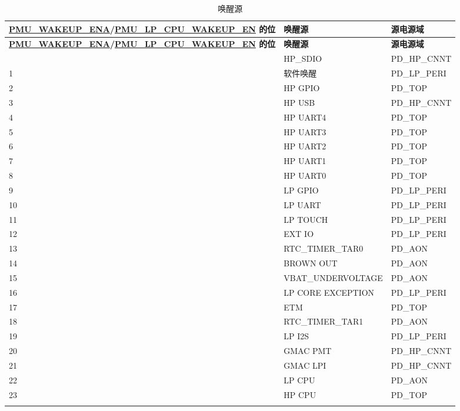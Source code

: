 \documentclass[main\_\_CN.tex]{subfiles}
\begin{document}
\begin{longtable}{ | l | l | l | }
\caption{唤醒源}
\label{tab:lowpowm-wakeup-source}
\\\hline
\rowcolor{lightgray}
\textbf{\hyperref[fielddesc:PMUWAKEUPENA]{PMU\_WAKEUP\_ENA}/\hyperref[fielddesc:PMULPCPUWAKEUPEN]{PMU\_LP\_CPU\_WAKEUP\_EN} 的位} & \textbf{唤醒源} &  \textbf{源电源域}   \\\hline
\endfirsthead
\hline\rowcolor{lightgray}
\textbf{\hyperref[fielddesc:PMUWAKEUPENA]{PMU\_WAKEUP\_ENA}/\hyperref[fielddesc:PMULPCPUWAKEUPEN]{PMU\_LP\_CPU\_WAKEUP\_EN} 的位} & \textbf{唤醒源} &  \textbf{源电源域}   \\\hline
\endhead
\endfoot
\iftagged{ESP32-P4-latest}{
    0 & HP\_SDIO & PD\_HP\_CNNT  \\\hline
    1 & 软件唤醒 & PD\_LP\_PERI \\\hline
    2 & HP GPIO   & PD\_TOP  \\\hline
    3 & HP USB  & PD\_HP\_CNNT  \\\hline
    4 & HP UART4 & PD\_TOP \\\hline
    5 & HP UART3 & PD\_TOP  \\\hline
    6 & HP UART2 & PD\_TOP  \\\hline
    7 & HP UART1 & PD\_TOP  \\\hline
    8 & HP UART0 & PD\_TOP  \\\hline
    9 & LP GPIO & PD\_LP\_PERI \\\hline
    10 & LP UART & PD\_LP\_PERI  \\\hline
    11 & LP TOUCH & PD\_LP\_PERI  \\\hline
    12 & EXT IO & PD\_LP\_PERI  \\\hline
    13 & RTC\_TIMER\_TAR0 & PD\_AON  \\\hline
    14 & BROWN OUT & PD\_AON  \\\hline
    15 & VBAT\_UNDERVOLTAGE & PD\_AON  \\\hline
    16 & LP CORE EXCEPTION & PD\_LP\_PERI  \\\hline
    17 & ETM & PD\_TOP  \\\hline
    18 & RTC\_TIMER\_TAR1 & PD\_AON  \\\hline
    19 & LP I2S & PD\_LP\_PERI  \\\hline
    20 & GMAC PMT & PD\_HP\_CNNT  \\\hline
    21 & GMAC LPI & PD\_HP\_CNNT  \\\hline
    22 & LP CPU & PD\_AON  \\\hline
    23 & HP CPU & PD\_TOP  \\\hline
}
\end{longtable}
\end{document}
